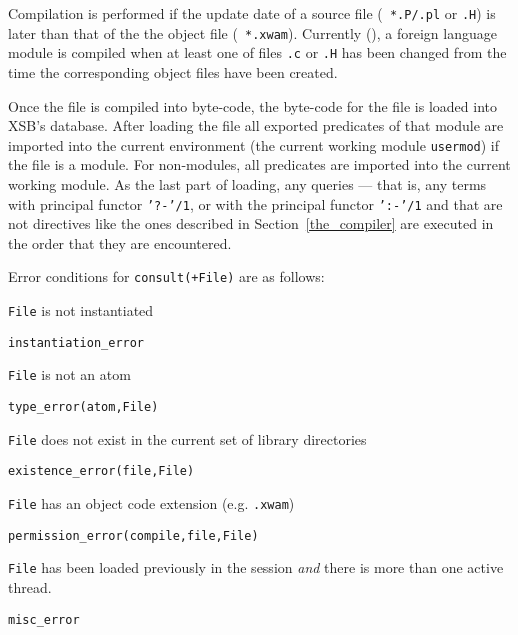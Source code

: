 Compilation is performed if the update date of a source file ({\tt
*.P/.pl} or {\tt *.H}) is later than that of the the object file ({\tt
*.xwam}).
Currently (\version), a foreign language module is compiled when at
least one of files {\tt *.c} or {\tt *.H} has been changed from the
time the corresponding object files have been created.

Once the file is compiled into byte-code, the byte-code for the file
is loaded into XSB's database.  After loading the file all exported
predicates of that module are imported into the current environment
(the current working module {\tt usermod}) if the file is a module.
For non-modules, all predicates are imported into the current working
module.  As the last part of loading, any queries --- that is, any
terms with principal functor {\tt '?-'/1}, or with the principal
functor {\tt ':-'/1} and that are not directives like the ones
described in Section~\ref{the_compiler} are executed in the order that
they are encountered.

Error conditions for {\tt consult(+File)} are as follows: 
\bi
\item 	{\tt File} is not instantiated
\bi
\item 	{\tt instantiation\_error}
\ei
%
\item 	{\tt File} is not an atom
\bi
\item 	{\tt type\_error(atom,File)}
\ei
\item 	{\tt File} does not exist in the current set of library directories
\bi
\item 	{\tt existence\_error(file,File)}
\ei
%
\item 	{\tt File} has an object code extension (e.g. {\tt .xwam})
\bi
\item 	{\tt permission\_error(compile,file,File)}
\ei
%
\item {\tt File} has been loaded previously in the session {\em and}
  there is more than one active thread.  \bi
\item 	{\tt misc\_error}
\ei
\ei

